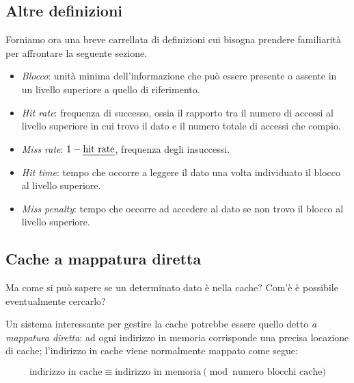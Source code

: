 \documentclass[class=book, crop=false, oneside]{standalone}
\begin{document}
\subsection*{Altre definizioni}
Forniamo ora una breve carrellata di definizioni cui bisogna prendere familiarità per affrontare la seguente sezione.
\begin{itemize}
	\item \emph{Blocco}: unità minima dell'informazione che può essere presente o assente in un livello superiore a quello di riferimento.
	\item \emph{Hit rate}: frequenza di successo, ossia il rapporto tra il numero di accessi al livello superiore in cui trovo il dato e il numero totale di accessi che compio.
	\item \emph{Miss rate}: \(1 - \textrm{\emph{hit rate}}\), frequenza degli insuccessi.
	\item \emph{Hit time}: tempo che occorre a leggere il dato una volta individuato il blocco al livello superiore.
	\item \emph{Miss penalty}: tempo che occorre ad accedere al dato se non trovo il blocco al livello superiore.
\end{itemize}

\subsection{Cache a mappatura diretta}\label{sec:direttamente}
Ma come si può sapere se un determinato dato è nella cache? Com'è è possibile eventualmente cercarlo?

Un sistema interessante per gestire la cache potrebbe essere quello detto \emph{a mappatura diretta}: ad ogni indirizzo in memoria corrisponde una precisa locazione di cache; l'indirizzo in cache viene normalmente mappato come segue:

\begin{equation*}
	\textrm{indirizzo in cache} \equiv \textrm{indirizzo in memoria}  \pmod{\textrm{numero blocchi cache}}
\end{equation*}
\end{document}
